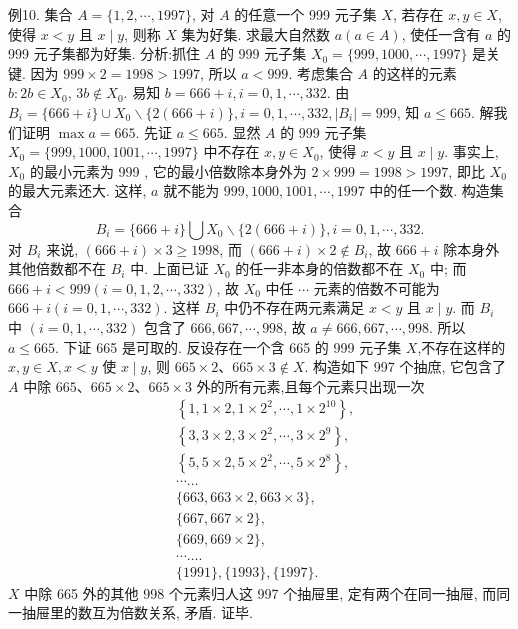 例10. 集合 $A=\{1,2, \cdots, 1997\}$, 对 $A$ 的任意一个 999 元子集 $X$, 若存在 $x, y \in X$, 使得 $x<y$ 且 $x \mid y$, 则称 $X$ 集为好集.
求最大自然数 $a(a \in A)$, 使任一含有 $a$ 的 999 元子集都为好集.
分析:抓住 $A$ 的 999 元子集 $X_0=\{999,1000, \cdots, 1997\}$ 是关键.
因为 $999 \times 2=1998>1997$, 所以 $a<999$. 考虑集合 $A$ 的这样的元素 $b: 2 b \in X_0$, $3 b \notin X_0$. 易知 $b=666+i, i=0,1, \cdots, 332$. 由 $B_i=\{666+i\} \cup X_0 \backslash \{2(666+i)\}, i=0,1, \cdots, 332,\left|B_i\right|=999$, 知 $a \leqslant 665$.
解我们证明 $\max a=665$.
先证 $a \leqslant 665$. 显然 $A$ 的 999 元子集 $X_0=\{999,1000,1001, \cdots, 1997\}$ 中不存在 $x, y \in X_0$, 使得 $x<y$ 且 $x \mid y$. 事实上, $X_0$ 的最小元素为 999 , 它的最小倍数除本身外为 $2 \times 999=1998>1997$, 即比 $X_0$ 的最大元素还大.
这样, $a$ 就不能为 $999,1000,1001, \cdots, 1997$ 中的任一个数.
构造集合
$$
B_i=\{666+i\} \bigcup X_0 \backslash\{2(666+i)\}, i=0,1, \cdots, 332 .
$$
对 $B_i$ 来说, $(666+i) \times 3 \geqslant 1998$, 而 $(666+i) \times 2 \notin B_i$, 故 $666+i$ 除本身外其他倍数都不在 $B_i$ 中.
上面已证 $X_0$ 的任一非本身的倍数都不在 $X_0$ 中; 而 $666+i<999(i=0,1,2, \cdots, 332)$, 故 $X_0$ 中任 $\cdots$ 元素的倍数不可能为 $666+i(i=0,1, \cdots, 332)$. 这样 $B_i$ 中仍不存在两元素满足 $x<y$ 且 $x \mid y$. 而 $B_i$ 中 $(i=0,1, \cdots, 332)$ 包含了 $666,667, \cdots, 998$, 故 $a \neq 666,667, \cdots, 998$. 所以 $a \leqslant 665$.
下证 665 是可取的.
反设存在一个含 665 的 999 元子集 $X$,不存在这样的 $x, y \in X, x<y$ 使 $x \mid y$, 则 $665 \times 2 、 665 \times 3 \notin X$.
构造如下 997 个抽庶, 它包含了 $A$ 中除 $665 、 665 \times 2 、 665 \times 3$ 外的所有元素,且每个元素只出现一次
$$
\begin{aligned}
& \left\{1,1 \times 2,1 \times 2^2, \cdots, 1 \times 2^{10}\right\}, \\
& \left\{3,3 \times 2,3 \times 2^2, \cdots, 3 \times 2^9\right\}, \\
& \left\{5,5 \times 2,5 \times 2^2, \cdots, 5 \times 2^8\right\}, \\
& \cdots \ldots \\
& \{663,663 \times 2,663 \times 3\}, \\
& \{667,667 \times 2\}, \\
& \{669,669 \times 2\}, \\
& \cdots \ldots . \\
& \{1991\},\{1993\},\{1997\} .
\end{aligned}
$$
$X$ 中除 665 外的其他 998 个元素归人这 997 个抽屉里, 定有两个在同一抽屉, 而同一抽屉里的数互为倍数关系, 矛盾.
证毕.


